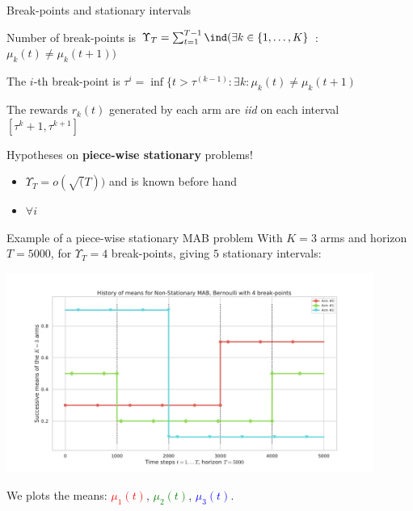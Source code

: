 \documentclass[11pt,english,ignorenonframetext,]{beamer}
\providecommand{\tightlist}{%
  \setlength{\itemsep}{0pt}\setlength{\parskip}{0pt}}
\begin{document}
\begin{frame}{Break-points and stationary intervals}

  Number of break-points is $\Upsilon_T = \sum_{t=1}^{T-1} \ind(\exists k\in \{1,\dots,K\}$ $:$ $\mu_k(t) \neq \mu_k(t+1) )$

  The $i$-th break-point is $\tau^{i} = \inf\{t > \tau^{(k-1)} : \exists k : \mu_k(t) \neq \mu_k(t+1)$

  The rewards $r_k(t)$ generated by each arm are \emph{iid} on each interval $[\tau^{k} + 1,\tau^{k+1}]$


  \begin{block}{Hypotheses on \textbf{piece-wise stationary} problems!}
    \begin{itemize}\tightlist
      \item $\Upsilon_T = o(\sqrt(T))$ and is known before hand
      \item $\forall i$
  \end{itemize}
\end{block}
\end{frame}


\begin{frame}[plain]{Example of a piece-wise stationary MAB problem}
  With $K=3$ arms and horizon $T=5000$,
  for $\Upsilon_T=4$ break-points, giving $5$ stationary intervals:
  \begin{center}
    \includegraphics[width=0.90\textwidth]{figures/Problem_1.pdf}
  \end{center}
  We plots the means:
  \textcolor{red}{$\mu_1(t)$},
  \textcolor{green}{$\mu_2(t)$},
  \textcolor{blue}{$\mu_3(t)$}.
\end{frame}
\end{document}
